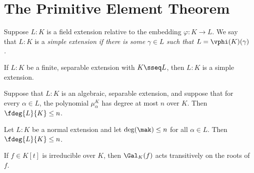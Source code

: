 \documentclass[a4paper]{article}
\begin{document}
\section{The Primitive Element Theorem}
\begin{tdefinition}
  Suppose \( L:K \) is a field extension relative to the embedding \( \varphi:K\to L \).
  We say that \( L:K \) is a \it{simple extension} if there is some \( \gamma\in L \) such that \( L=\vphi(K)(\gamma) \).
\end{tdefinition}

\begin{ttheorem}
  If \( L:K \) be a finite, separable extension with \( K\sseq L \), then \( L:K \) is a simple extension.
\end{ttheorem}

\begin{tcorollary}
  Suppose that \( L:K \) is an algebraic, separable extension, and suppose that for every \( \alpha\in L \), the polynomial \( \mu_\alpha^K \) has degree at most \( n \) over \( K \).
  Then \( \fdeg{L}{K}\leq n \).
\end{tcorollary}

\quad Let \( L:K \) be a normal extension and let \( \deg(\mak)\leq n \) for all \( \alpha\in L \).
Then \( \fdeg{L}{K}\leq n \).

\begin{tcorollary}
  If \( f\in K[t] \) is irreducible over \( K \), then \( \Gal_K(f) \) acts transitively on the roots of \( f \).
\end{tcorollary}
\end{document}
